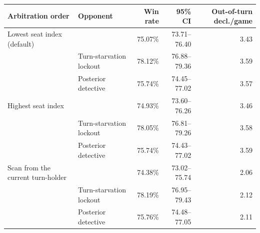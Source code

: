 \begin{tabular}{llrrr}
\toprule
Arbitration order & Opponent & Win rate & 95\% CI & Out-of-turn decl./game \\
\midrule
Lowest seat index (default) & \vthree{} & 75.07\% & 73.71--76.40 & 3.43 \\
 & Turn-starvation lockout & 78.12\% & 76.88--79.36 & 3.59 \\
 & Posterior detective & 75.74\% & 74.45--77.02 & 3.57 \\
Highest seat index & \vthree{} & 74.93\% & 73.60--76.26 & 3.46 \\
 & Turn-starvation lockout & 78.05\% & 76.81--79.26 & 3.58 \\
 & Posterior detective & 75.74\% & 74.43--77.02 & 3.59 \\
Scan from the current turn-holder & \vthree{} & 74.38\% & 73.02--75.74 & 2.06 \\
 & Turn-starvation lockout & 78.19\% & 76.95--79.43 & 2.12 \\
 & Posterior detective & 75.76\% & 74.48--77.05 & 2.11 \\
\bottomrule
\end{tabular}